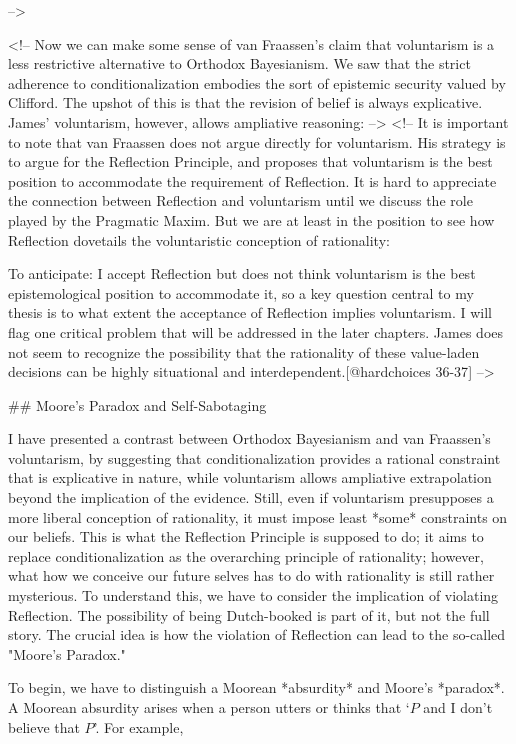 --\textgreater{}

\textless{}!-- Now we can make some sense of van Fraassen's claim that
voluntarism is a less restrictive alternative to Orthodox Bayesianism.
We saw that the strict adherence to conditionalization embodies the sort
of epistemic security valued by Clifford. The upshot of this is that the
revision of belief is always explicative. James' voluntarism, however,
allows ampliative reasoning: --\textgreater{} \textless{}!-- It is
important to note that van Fraassen does not argue directly for
voluntarism. His strategy is to argue for the Reflection Principle, and
proposes that voluntarism is the best position to accommodate the
requirement of Reflection. It is hard to appreciate the connection
between Reflection and voluntarism until we discuss the role played by
the Pragmatic Maxim. But we are at least in the position to see how
Reflection dovetails the voluntaristic conception of rationality:

To anticipate: I accept Reflection but does not think voluntarism is the
best epistemological position to accommodate it, so a key question
central to my thesis is to what extent the acceptance of Reflection
implies voluntarism. I will flag one critical problem that will be
addressed in the later chapters. James does not seem to recognize the
possibility that the rationality of these value-laden decisions can be
highly situational and interdependent.{[}@hardchoices 36-37{]}
--\textgreater{}

\#\# Moore's Paradox and Self-Sabotaging

I have presented a contrast between Orthodox Bayesianism and van
Fraassen's voluntarism, by suggesting that conditionalization provides a
rational constraint that is explicative in nature, while voluntarism
allows ampliative extrapolation beyond the implication of the evidence.
Still, even if voluntarism presupposes a more liberal conception of
rationality, it must impose least *some* constraints on our beliefs.
This is what the Reflection Principle is supposed to do; it aims to
replace conditionalization as the overarching principle of rationality;
however, what how we conceive our future selves has to do with
rationality is still rather mysterious. To understand this, we have to
consider the implication of violating Reflection. The possibility of
being Dutch-booked is part of it, but not the full story. The crucial
idea is how the violation of Reflection can lead to the so-called
"Moore's Paradox."

To begin, we have to distinguish a Moorean *absurdity* and Moore's
*paradox*. A Moorean absurdity arises when a person utters or thinks
that `\(P\) and I don't believe that \(P\)'. For example,

